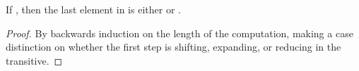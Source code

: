 \begin{isabellebody}
\begin{isamarkuptext}
\begin{lemma}\label{reaches_final_imp_last_is_init_or_final}
If , then the last element in
 is either  or .
\begin{proof}
By backwards induction on the length of the computation, making a case distinction on whether
the first step is shifting, expanding, or reducing in the transitive.
\end{proof}
\end{lemma}


\end{isamarkuptext}
\end{isabellebody}
